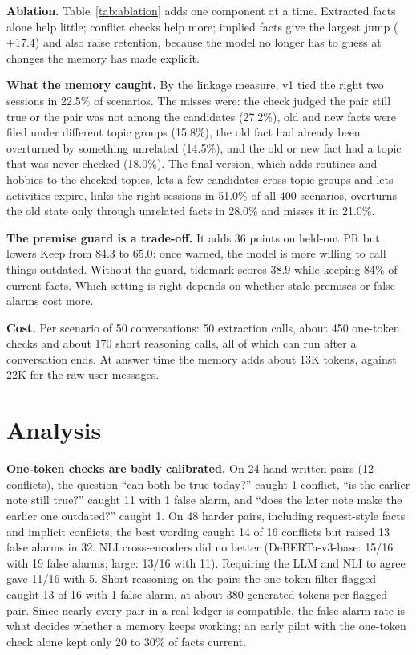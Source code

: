 \documentclass[10pt,twocolumn]{article}
\begin{document}
\textbf{Ablation.} Table~\ref{tab:ablation} adds one component at a time. Extracted facts alone help little;
conflict checks help more; implied facts give the largest jump ($+17.4$) and also raise retention, because the model
no longer has to guess at changes the memory has made explicit.

\textbf{What the memory caught.} By the linkage measure, v1 tied the right two sessions in 22.5\% of scenarios. The
misses were: the check judged the pair still true or the pair was not among the candidates (27.2\%), old and new facts
were filed under different topic groups (15.8\%), the old fact had already been overturned by something unrelated
(14.5\%), and the old or new fact had a topic that was never checked (18.0\%). The final version, which adds routines
and hobbies to the checked topics, lets a few candidates cross topic groups and lets activities expire, links the right
sessions in 51.0\% of all 400 scenarios, overturns the old state only through unrelated facts in 28.0\% and misses it
in 21.0\%.

\textbf{The premise guard is a trade-off.} It adds 36 points on held-out PR but lowers Keep from 84.3 to 65.0: once
warned, the model is more willing to call things outdated. Without the guard, tidemark scores 38.9 while keeping 84\%
of current facts. Which setting is right depends on whether stale premises or false alarms cost more.

\textbf{Cost.} Per scenario of 50 conversations: 50 extraction calls, about 450 one-token checks and about 170 short
reasoning calls, all of which can run after a conversation ends. At answer time the memory adds about 13K tokens,
against 22K for the raw user messages.

\section{Analysis}

\textbf{One-token checks are badly calibrated.} On 24 hand-written pairs (12 conflicts), the question ``can both be
true today?'' caught 1 conflict, ``is the earlier note still true?'' caught 11 with 1 false alarm, and ``does the later
note make the earlier one outdated?'' caught 1. On 48 harder pairs, including request-style facts and implicit
conflicts, the best wording caught 14 of 16 conflicts but raised 13 false alarms in 32. NLI cross-encoders did no
better (DeBERTa-v3-base: 15/16 with 19 false alarms; large: 13/16 with 11). Requiring the LLM and NLI to agree gave
11/16 with 5. Short reasoning on the pairs the one-token filter flagged caught 13 of 16 with 1 false alarm, at about
380 generated tokens per flagged pair. Since nearly every pair in a real ledger is compatible, the false-alarm rate is
what decides whether a memory keeps working; an early pilot with the one-token check alone kept only 20 to 30\% of
facts current.
\end{document}
